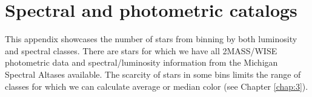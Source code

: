 \chapter{Spectral and photometric catalogs}\label{Appendix:1}
This appendix showcases the number of stars from binning by both luminosity and spectral classes. There are \bincount stars for which we have all 2MASS/WISE photometric data and spectral/luminosity information from the Michigan Spectral Altases available. The scarcity of stars in some bins limits the range of classes for which we can calculate average or median color (see Chapter \ref{chap:3}).



